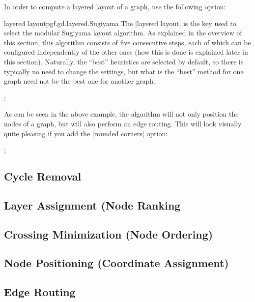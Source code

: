 In order to compute a layered layout of a graph, use the following option:

\begin{gdalgorithm}{layered layout}{pgf.gd.layered.Sugiyama}
  The |layered layout| is the key used to select the modular Sugiyama
  layout algorithm. As explained in the overview of this section, this
  algorithm consists of five consecutive steps, each of which can be
  configured independently of the other ones (how this is done is
  explained later in this section). Naturally, the ``best'' heuristics
  are selected by default, so there is typically no need to change the
  settings, but what is the ``best'' method for one graph need not be
  the best one for another graph.
  
\begin{codeexample}[]
\tikz {};    
\end{codeexample}

  As can be seen in the above example, the algorithm will not only
  position the nodes of a graph, but will also perform an edge
  routing. This will look visually quite pleasing if you add the
  |rounded corners| option:

\begin{codeexample}[]
 ;    
\end{codeexample}

\end{gdalgorithm}



\subsection{Cycle Removal}

\subsection{Layer Assignment (Node Ranking}

\subsection{Crossing Minimization (Node Ordering)}

\subsection{Node Positioning (Coordinate Assignment)}

\subsection{Edge Routing}




